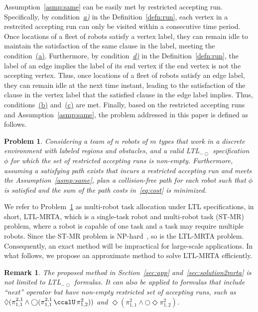\documentclass[Afour,sageh,times]{sagej}
\newtheorem{problem}{Problem}
\newtheorem{rem}[thm]{Remark}
\newcommand{\ltl}{ {\it LTL}$_{-\bigcirc}$ }
\renewcommand{\ap}[3]{\mathcal{\pi}_{{#1},{#2}}^{#3}}
\begin{document}
Assumption~\ref{asmp:same} can be easily met by restricted accepting run. Specifically, by condition~\hyperref[cond:a]{\it a)} in the Definition~\ref{defn:run}, each vertex in a restrcited accepting run can only be visited within a consecutive time period.  Once locations of a fleet of robots satisfy a  vertex label, they can remain idle to maintain the satisfaction of the same clause in the label, meeting the condition~\hyperref[asmp:a]{(a)}. Furthermore, by condition~\hyperref[cond:d]{\it d)} in the Definition~\ref{defn:run}, the label of an edge implies the label of its end vertex if the end vertex is not the accepting vertex. Thus, once locations of a fleet of  robots satisfy an edge label, they can remain idle at the next time instant, leading to the satisfaction of the clause in the vertex label that the satisfied clause in the edge label implies. Thus, conditions~\hyperref[asmp:b]{(b)} and~\hyperref[asmp:c]{(c)} are met. Finally, based on  the restricted accepting runs and Assumption~\ref{asmp:same}, the problem addressed in this paper is defined as follows.



\begin{problem}\label{prob:1}
Considering a team of $n$ robots of $m$ types that work in a discrete environment with labeled regions and obstacles, and a valid \ltl specification $\phi$ for which the  set of restricted accepting runs is non-empty. Furthermore, assuming a satisfying path exists that incurs a restricted  accepting run  and meets the Assumption~\ref{asmp:same}, plan a collision-free path for each robot such that $\phi$ is satisfied and the sum of the path costs in~\eqref{eq:cost} is minimized.
\end{problem}

We refer to Problem~\ref{prob:1} as multi-robot task allocation under LTL specifications, in short, LTL-MRTA, which is a single-task robot and multi-robot task (ST-MR) problem, where a robot is capable of one task and a task may require multiple robots. Since the ST-MR problem is NP-hard~\cite{korsah2013comprehensive,nunes2017taxonomy}, so is the LTL-MRTA problem. Consequently, an exact method will be impractical for large-scale applications. In what follows, we propose an approximate method to solve LTL-MRTA efficiently.

\begin{rem}
The proposed method in Section~\ref{sec:app} and~\ref{sec:solution2mrta} is not limited to  LTL$_{-\bigcirc}$ formulas. It can also be applied to  formulas that include ``next'' operator but have non-empty restricted set of accepting runs, such as $\Diamond(\ap{1}{1}{2,1} \wedge \bigcirc (\ap{1}{1}{2,1} \,\ccalU\, \ap{1}{2}{2}))$ and $\Diamond (\ap{1}{1}{2}  \wedge \bigcirc \Diamond \ap{1}{2}{2})$.
\end{rem}
\end{document}
